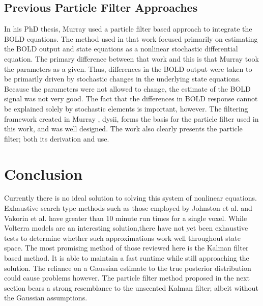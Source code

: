 \subsection{Previous Particle Filter Approaches}
In his PhD thesis, Murray \cite{Murray2008} used a particle filter based 
approach to integrate
the \ac{BOLD} equations. The method used in that work focused primarily on estimating
the \ac{BOLD} output and state equations as a nonlinear stochastic differential 
equation. The primary difference between that work and this is that
Murray \cite{Murray2008} took the parameters as a given. Thus, differences in the \ac{BOLD} output
were taken to be primarily driven by stochastic changes in the underlying state
equations. Because the parameters were not allowed to change, the estimate of 
the \ac{BOLD} signal was not very good. The fact that the
differences in \ac{BOLD} response cannot be explained solely by stochastic elements 
is important, however. The filtering framework created
in Murray \cite{Murray2008}, dysii, forms the basis for the particle 
filter used in this work, 
and was well designed. The work also clearly presents the particle filter;
both its derivation and use. 

\section{Conclusion}
Currently there is no ideal solution to solving this system of nonlinear
equations. Exhaustive search type methods such as those employed by
Johnston et al. \cite{Johnston2007} and Vakorin et al. \cite{Vakorin2007}
have greater than 10 minute run times for a single voxel. 
While Volterra models are an interesting
solution,there have not yet been exhaustive tests to determine whether
such approximations work well throughout state space. The most promising
method of those reviewed here is the Kalman filter based method. It is
able to maintain a fast runtime while still approaching the solution.
The reliance on a Gaussian estimate to the true posterior distribution could
cause problems however. 
The particle filter method proposed in the next section bears a strong 
resemblance to the unscented Kalman filter; albeit without the Gaussian 
assumptions. 
